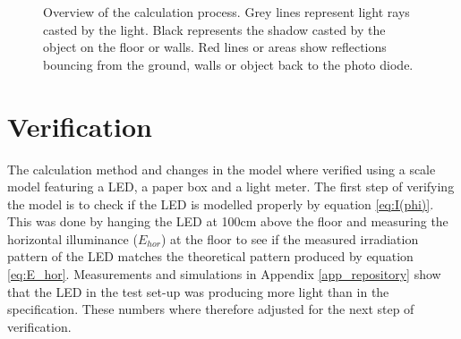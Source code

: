 \begin{figure}
	\centering     %
	\caption{Overview of the calculation process. Grey lines represent light rays casted by the light. Black represents the shadow casted by the object on the floor or walls. Red lines or areas show reflections bouncing from the ground, walls or object back to the photo diode.\label{fig:raytracing}}
\end{figure}

\section{Verification}
\label{sec:verification}
The calculation method and changes in the model where verified using a scale model featuring a LED\cite{lamptest}, a paper box and a light meter\cite{LuxMeter}. The first step of verifying the model is to check if the LED is modelled properly by equation \ref{eq:I(phi)}. This was done by hanging the LED at 100cm above the floor and measuring the horizontal illuminance ($E_{hor}$) at the floor to see if the measured irradiation pattern of the LED matches the theoretical pattern produced by equation \ref{eq:E_hor}. Measurements and simulations in Appendix \ref{app_repository} show that the LED in the test set-up was producing more light than in the specification. These numbers where therefore adjusted for the next step of verification.

